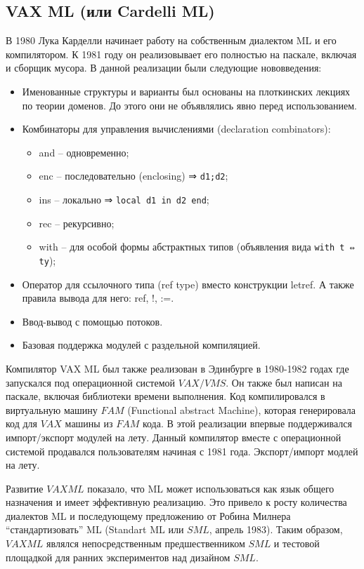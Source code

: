 \documentclass[14pt]{matmex-diploma-custom}
\begin{document}
\subsection{VAX ML (или Cardelli ML)}
В 1980 Лука Карделли начинает работу на собственным диалектом ML и его компилятором. К 1981 году он реализовывает его полностью на паскале, включая и сборщик мусора. В данной реализации были следующие нововведения:
\begin{itemize}
\item Именованные структуры и варианты был основаны на плоткинских лекциях по теории доменов. До этого они не объявлялись явно перед использованием.
\item Комбинаторы для управления вычислениями (declaration combinators):
      \begin{itemize}
	\item and -- одновременно;
	\item enc -- последовательно (enclosing)  ⇒ \verb=d1;d2=;
	\item ins -- локально  ⇒ \verb=local d1 in d2 end=;
	\item rec -- рекурсивно;
	\item with -- для особой формы абстрактных типов (объявления вида \verb=with t ⇔ ty=);
      \end{itemize}
\item Оператор для ссылочного типа (ref type) вместо конструкции letref. А также правила вывода для него: ref, !, :=.
\item Ввод-вывод с помощью потоков.
\item Базовая поддержка модулей с раздельной компиляцией.
\end{itemize}

Компилятор VAX ML был также реализован в Эдинбурге в 1980-1982 годах где запускался под операционной системой $VAX/VMS$. Он также был написан на паскале, включая библиотеки времени выполнения. Код компилировался в  виртуальную машину $FAM$ (Functional abstract Machine), которая генерировала код для $VAX$ машины из $FAM$ кода. В этой реализации впервые поддерживался импорт/экспорт модулей на лету. Данный компилятор вместе с операционной системой продавался пользователям начиная с 1981 года.
Экспорт/импорт модлей на лету.

Развитие $VAX ML$ показало, что ML может использоваться как язык общего назначения и имеет эффективную реализацию. Это привело к росту количества диалектов ML и последующему предложению от Робина Милнера “стандартизовать” ML (Standart ML или $SML$, апрель 1983). Таким образом,  $VAX ML$ являлся непосредственным предшественником $SML$ и тестовой площадкой для ранних экспериментов над дизайном $SML$.
\end{document}
